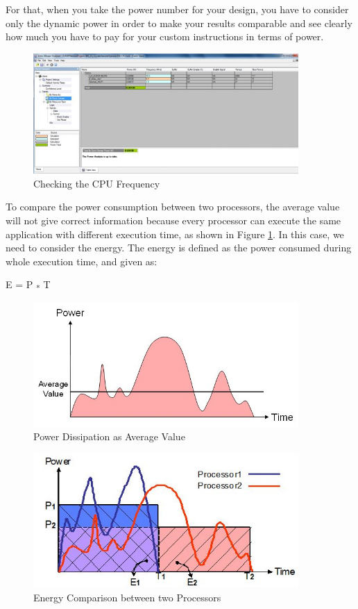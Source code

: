 For that, when you take the power number for your design, you have to
consider only the dynamic power in order to make your results comparable
and see clearly how much you have to pay for your custom instructions in
terms of power.
\begin{figure}[!htb]
	\centering
	\includegraphics[width=0.9\textwidth]{src/images/7-3.png}
	\caption{Checking the CPU Frequency}
	\label{fig:fig73}
\end{figure}
To compare the power consumption between two processors, the average
value will not give correct information because every processor can
execute the same application with different execution time, as shown in Figure \ref{fig:fig73}. In this case, we need to consider
the energy. The energy is defined as the power consumed during whole
execution time, and given as:

E = P \textsubscript{*} T
\begin{figure}[!htb]
	\centering
	\includegraphics[width=0.9\textwidth]{src/images/7-4.png}
	\caption{Power Dissipation as Average Value}
	\label{fig:fig74}
\end{figure}
\begin{figure}[!htb]
	\centering
	\includegraphics[width=0.9\textwidth]{src/images/7-5.png}
	\caption{Energy Comparison between two Processors}
	\label{fig:fig75}
\end{figure}
